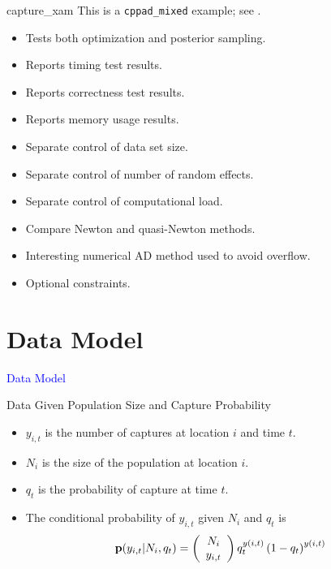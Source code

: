 \documentclass{beamer}
\newcommand{\Blue}[1]{\textcolor{blue}{#1}}
\newcommand{\B}[1]{{\bf #1}}
\newcommand{\Section}[1]{
	\section{#1}
	\begin{frame}
	\begin{center}
	\Blue{ \Large{#1} }
	\end{center}
	\end{frame}
}
\begin{document}
\begin{frame}{capture\_xam}
This is a \texttt{cppad\_mixed} example; see  \cite{Royle2004}.
\pause

\begin{itemize}

\item
Tests both optimization and posterior sampling.
\pause

\item
Reports timing test results.
\pause

\item
Reports correctness test results.
\pause

\item
Reports memory usage results.
\pause

\item
Separate control of data set size.
\pause

\item
Separate control of number of random effects.
\pause

\item
Separate control of computational load.
\pause

\item
Compare Newton and quasi-Newton methods.
\pause

\item
Interesting numerical AD method used to avoid overflow.
\pause

\item
Optional constraints.

\end{itemize}
\end{frame}

\Section{Data Model}

\begin{frame}{Data Given Population Size and Capture Probability}
\begin{itemize}

\item
$y_{i,t}$ is the number of captures at location $i$ and time $t$.
\pause

\item
$N_i$ is the size of the population at location $i$.
\pause

\item
$q_t$ is the probability of capture at time $t$.
\pause

\item
The conditional probability of $y_{i,t}$ given $N_i$ and $q_t$ is
\[
\B{p} ( y_{i,t} | N_i , q_t )
=
\left( \begin{array}{c} N_i \\ y_{i,t} \end{array} \right)
q_t^{y(i,t)} \left( 1 - q_t\right)^{y(i,t)}
\]

\end{itemize}
\end{frame}
\end{document}
